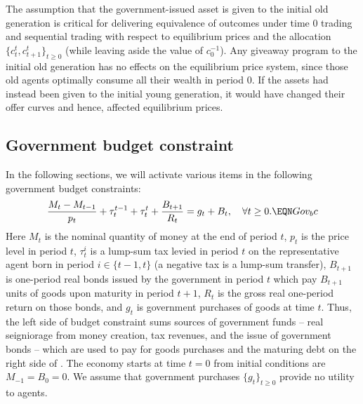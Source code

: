 The assumption that the government-issued asset 
is given to the initial old generation 
is critical for delivering  equivalence of 
outcomes under time $0$ trading and sequential 
trading with respect to equilibrium prices and
the allocation $\{c^t_t, c^t_{t+1}\}_{t\geq0}$
(while leaving aside the value of $c^{-1}_0$).
Any giveaway program to the 
initial old generation has no effects on the 
equilibrium price system, since 
those old agents optimally consume all their
wealth in period $0$. If the assets had
instead been given to the initial young generation,
it would have changed their offer curves and hence, 
affected equilibrium prices.




\subsection{Government budget constraint}
In the following sections, we will activate various items
in the following government budget constraints: 
$$ {M_t - M_{t-1} \over  p_t} + \tau^{t-1}_t + \tau^t_t 
+ {B_{t+1} \over R_t} = g_t + B_t,  \quad \forall t \geq 0. \EQN Gov_bc $$
Here  $M_t$ is the nominal quantity of money at the end of period $t$,
$p_t$ is the price level in period $t$, $\tau^i_t$ is a lump-sum
tax levied in period $t$ on the representative agent born in 
period $i\in\{t-1, t\}$ (a negative tax is a lump-sum transfer), 
$B_{t+1}$ is
one-period real bonds issued by the government in period $t$ which
pay $B_{t+1}$ units of goods upon maturity in period $t+1$, $R_t$
is the gross real one-period return on those bonds, and
$g_t$ is government purchases of goods at time $t$. Thus,
the left side of budget constraint  sums sources of  
government funds -- real seigniorage from money creation,
tax revenues, and the issue of government bonds -- which are
used to pay for goods purchases and the maturing debt on
the right side of . The economy starts
at time $t=0$ from  initial conditions are 
$M_{-1}= B_0 = 0$. We assume that government purchases
$\{g_t\}_{t \geq 0}$ provide no utility to agents.



